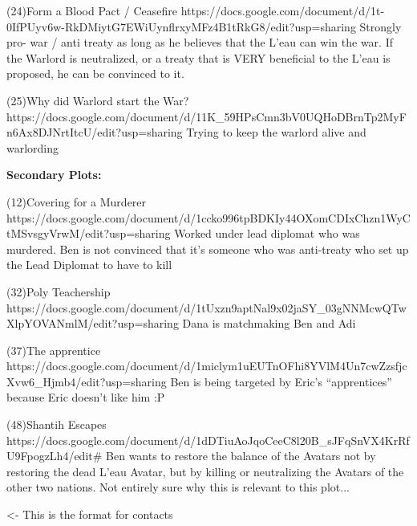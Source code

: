 \documentclass[char]{GL2020}
\begin{document}
(24)Form a Blood Pact / Ceasefire https://docs.google.com/document/d/1t-0IfPUyv6w-RkDMiytG7EWiUynflrxyMFz4B1tRkG8/edit?usp=sharing
Strongly pro- war / anti treaty as long as he believes that the L’eau can win the war. If the Warlord is neutralized, or a treaty that is VERY beneficial to the L’eau is proposed, he can be convinced to it.

(25)Why did Warlord start the War? https://docs.google.com/document/d/11K_59HPsCmn3bV0UQHoDBrnTp2MyFn6Ax8DJNrtItcU/edit?usp=sharing
Trying to keep the warlord alive and warlording

\textbf{Secondary Plots:}

(12)Covering for a Murderer https://docs.google.com/document/d/1ccko996tpBDKIy44OXomCDIxChzn1WyCtMSvsgyVrwM/edit?usp=sharing
Worked under lead diplomat who was murdered.  Ben is not convinced that it’s someone who was anti-treaty who set up the Lead Diplomat to have to kill

(32)Poly Teachership https://docs.google.com/document/d/1tUxzn9aptNal9x02jaSY_03gNNMcwQTwXlpYOVANmlM/edit?usp=sharing
Dana is matchmaking Ben and Adi

(37)The apprentice https://docs.google.com/document/d/1miclym1uEUTnOFhi8YVlM4Un7cwZzsfjcXvw6_Hjmb4/edit?usp=sharing
Ben is being targeted by Eric's "`apprentices"' because Eric doesn't like him :P
 
(48)Shantih Escapes  https://docs.google.com/document/d/1dDTiuAoJqoCeeC8l20B_sJFqSnVX4KrRfU9FpogzLh4/edit#
Ben wants to restore the balance of the Avatars not by restoring the dead L’eau Avatar, but by killing or neutralizing the Avatars of the other two nations.  Not entirely sure why this is relevant to this plot...


\begin{itemz}[Goals]
	\item 
\end{itemz}

\begin{itemz}[Notes]
	\item 
\end{itemz}

\begin{contacts}
	\contact{\cTest{}} <- This is the format for contacts 
\end{contacts}
\end{document}
